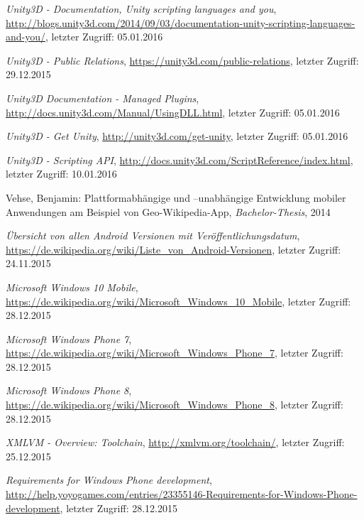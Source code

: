 \begin{thebibliography}{}
\emph{Unity3D - Documentation, Unity scripting languages and you},
\url{http://blogs.unity3d.com/2014/09/03/documentation-unity-scripting-languages-and-you/}, letzter Zugriff: 05.01.2016

\emph{Unity3D - Public Relations},
\url{https://unity3d.com/public-relations}, letzter Zugriff: 29.12.2015

\emph{Unity3D Documentation - Managed Plugins},
\url{http://docs.unity3d.com/Manual/UsingDLL.html}, letzter Zugriff: 05.01.2016

\emph{Unity3D - Get Unity},
\url{http://unity3d.com/get-unity}, letzter Zugriff: 05.01.2016

\emph{Unity3D - Scripting API},
\url{http://docs.unity3d.com/ScriptReference/index.html}, letzter Zugriff: 10.01.2016

Vehse, Benjamin:
\glqq Plattformabhängige und –unabhängige
Entwicklung mobiler Anwendungen am
Beispiel von Geo-Wikipedia-App\grqq, 
\emph{Bachelor-Thesis}, 2014

\emph{Übersicht von allen Android Versionen mit Veröffentlichungsdatum},
\url{https://de.wikipedia.org/wiki/Liste_von_Android-Versionen}, letzter Zugriff: 24.11.2015

\emph{Microsoft Windows 10 Mobile},
\url{https://de.wikipedia.org/wiki/Microsoft_Windows_10_Mobile}, letzter Zugriff: 28.12.2015

\emph{Microsoft Windows Phone 7},
\url{https://de.wikipedia.org/wiki/Microsoft_Windows_Phone_7}, letzter Zugriff: 28.12.2015

\emph{Microsoft Windows Phone 8},
\url{https://de.wikipedia.org/wiki/Microsoft_Windows_Phone_8}, letzter Zugriff: 28.12.2015

\emph{XMLVM - Overview: Toolchain},
\url{http://xmlvm.org/toolchain/}, letzter Zugriff: 25.12.2015

\emph{Requirements for Windows Phone development},
\url{http://help.yoyogames.com/entries/23355146-Requirements-for-Windows-Phone-development}, letzter Zugriff: 28.12.2015


\end{thebibliography}
\clearpage\thispagestyle{empty}
\eigen  %
